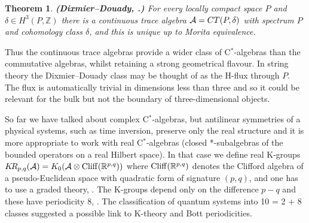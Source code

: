 \documentclass[11pt]{article}
\newcommand{\real}{{\mathbb R}}
\newcommand{\integer}{{\mathbb Z}}
\newcommand{\alg}{{\cal A}}
\newtheorem{theorem}{Theorem}
\begin{document}
\begin{theorem} {\bf (Dixmier--Douady, \cite{DD63}.)}
For every locally compact space  $P$ and $\delta\in H^3(P,\integer)$ there is a continuous trace algebra $\alg = CT(P,\delta)$  with spectrum $P$ and cohomology class  $\delta$, and this is unique up to Morita equivalence.
\end{theorem} 


Thus the continuous trace algebras provide a wider class of C$^*$-algebras than the commutative algebras, whilst retaining a strong geometrical flavour. 
In string theory the Dixmier--Douady class may be thought of as the H-flux through $P$.  
The flux is automatically trivial in dimensions less than three and so it could be relevant for the bulk but not the boundary of three-dimensional objects. 

So far we have talked about complex C$^*$-algebras, but antilinear symmetries of a physical systems, such as  time inversion, preserve only the real structure and  it is more appropriate to work with real C$^*$-algebras (closed *-subalgebras of the bounded operators on a real Hilbert space).
In that case we define real K-groups $K\!R_{p,q}(\alg) = K_0(\alg\otimes {\rm Cliff}(\real^{p,q}))$ where ${\rm Cliff}(\real^{p,q})$ denotes the Clifford algebra of a pseudo-Euclidean space with quadratic form of signature $(p,q)$, and one has to use a graded theory, \cite{ABS,K,KK88}. The K-groups depend only on the difference $p-q$ and these have periodicity 8, \cite{A66}.
The  classification of quantum systems into 10 = 2 + 8 classes suggested a possible link to K-theory and  Bott periodicities.






\end{document}
